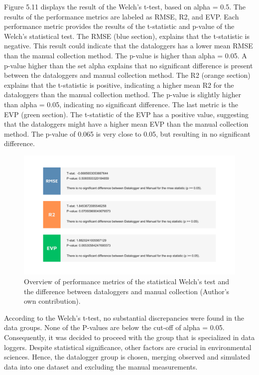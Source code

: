 Figure 5.11 displays the result of the Welch's t-test, based on alpha = 0.5. The results of the performance metrics are labeled as RMSE, R2, and EVP. Each performance metric provides the results of the t-statistic and p-value of the Welch's statistical test. The RMSE (blue section), explains that the t-statistic is negative. This result could indicate that the dataloggers has a lower mean RMSE than the manual collection method. The p-value is higher than alpha = 0.05. A p-value higher than the set alpha explains that no significant difference is present between the dataloggers and manual collection method. The R2 (orange section) explains that the t-statistic is positive, indicating a higher mean R2 for the dataloggers than the manual collection method. The p-value is slightly higher than alpha = 0.05, indicating no significant difference. The last metric is the EVP (green section). The t-statistic of the EVP has a positive value, suggesting that the dataloggers might have a higher mean EVP than the manual collection method. The p-value of 0.065 is very close to 0.05, but resulting in no significant difference. 

\begin{figure}[htbp]
    \centering
    \includegraphics[width=0.80\linewidth]{rozstat.png}
    \caption{Overview of performance metrics of the statistical Welch's test and the difference between dataloggers and manual collection (Author's own contribution).}
\end{figure}

According to the Welch's t-test, no substantial discrepancies were found in the data groups. None of the P-values are below the cut-off of alpha = 0.05. Consequently, it was decided to proceed with the group that is specialized in data loggers. Despite statistical significance, other factors are crucial in environmental sciences. Hence, the datalogger group is chosen, merging observed and simulated data into one dataset and excluding the manual measurements. 

